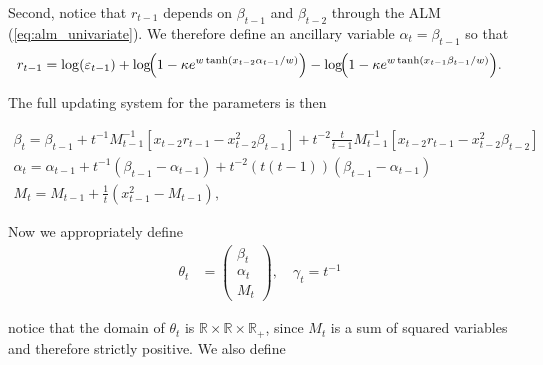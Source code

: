\documentclass[11pt]{article}
\begin{document}
Second, notice that $r_{t-1}$ depends on $\beta_{t-1}$ and $\beta_{t-2}$ through the ALM (\ref{eq:alm_univariate}).
We therefore define an ancillary variable $\alpha_t = \beta_{t-1}$ so that
\begin{equation}
    r_{t-1} = \log(\varepsilon_{t-1})
    + \log\!\Bigl(1 - \kappa e^{w \tanh(x_{t-2} \alpha_{t-1} / w)}\Bigr)
    - \log\!\Bigl(1 - \kappa e^{w \tanh(x_{t-1} \beta_{t-1} / w)}\Bigr).
\end{equation} 

The full updating system for the parameters is then 

\begin{equation}
    \begin{aligned}
        \beta_t = \beta_{t-1} + t^{-1} M^{-1}_{t-1} \left[ x_{t-2} r_{t-1} - x_{t-2}^2 \beta_{t-1} \right]  + t^{-2} \frac{t}{t-1} M^{-1}_{t-1} \left[ x_{t-2} r_{t-1} - x_{t-2}^2 \beta_{t-2} \right]\\
        \alpha_t = \alpha_{t-1} + t^{-1} (\beta_{t-1} - \alpha_{t-1}) + t^{-2} \left(t(t-1)\right)(\beta_{t-1} - \alpha_{t-1}) \\
        M_t = M_{t-1} + \frac{1}{t} \left(x_{t-1}^2 - M_{t-1} \right),
    \end{aligned}
\end{equation}


Now we appropriately define 
\begin{equation}
\begin{aligned}
\theta_t &= 
\begin{pmatrix}
\beta_t \\
\alpha_t \\
M_t
\end{pmatrix}, \quad
\gamma_t = t^{-1}
\end{aligned}
\end{equation}


notice that the domain of $\theta_t$ is $\mathbb{R} \times \mathbb{R} \times \mathbb{R}_{+}$, since $M_t$ is a sum of squared variables and therefore strictly positive.
We also define
\end{document}
